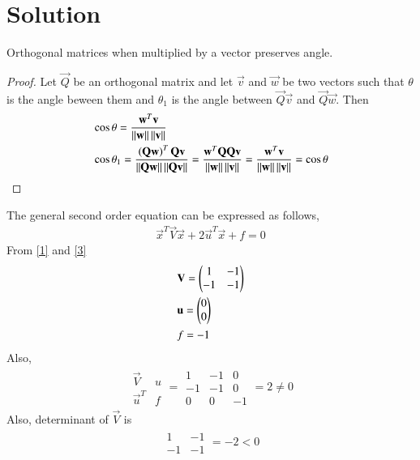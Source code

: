 \documentclass[journal,12pt,twocolumn]{IEEEtran}
\begin{document}
\section{Solution}
\begin{lemma} \label{0}
	Orthogonal matrices when multiplied by a vector preserves angle.
\end{lemma}
\begin{proof}
Let $\vec{Q}$ be an orthogonal matrix and let $\vec{v}$ and $\vec{w}$ be two vectors such that $\theta$ is the angle beween them and $\theta_1$ is the angle between $\vec{Q}\vec{v}$ and $\vec{Q}\vec{w}$. Then
\begin{align}
&	\cos\theta = \frac{\mathbf{w}^T\mathbf{v}}{\left\lVert\mathbf{w}\right\rVert\left\lVert\mathbf{v}\right\rVert} \\
&   \cos\theta_1 = \frac{\left(\mathbf{Q}\mathbf{w}\right)^T\mathbf{Q}\mathbf{v}}{\left\lVert\mathbf{Q}\mathbf{w}\right\rVert\left\lVert\mathbf{Q}\mathbf{v}\right\rVert} = \frac{\mathbf{w}^T\mathbf{Q}\mathbf{Q}\mathbf{v}}{\left\lVert\mathbf{w}\right\rVert\left\lVert\mathbf{v}\right\rVert} = \frac{\mathbf{w}^T\mathbf{v}}{\left\lVert\mathbf{w}\right\rVert\left\lVert\mathbf{v}\right\rVert} = \cos\theta
\end{align} 
\end{proof}
The general second order equation can be expressed as follows,
\begin{align}
	\vec{x}^T\vec{V}\vec{x} + 2\vec{u}^T\vec{x} + f = 0 \label{3}
\end{align}
From \eqref{1} and \eqref{3}
\begin{align}
	& \mathbf{V} = \begin{pmatrix}1 & -1 \\ -1 & -1\end{pmatrix} \\ 
	& \mathbf{u} = \begin{pmatrix}0 \\0\end{pmatrix}\\
	& f = -1
\end{align}
Also,
\begin{align}
	\begin{array}{|cc|}
		\vec{V} & u\\ \vec{u}^T & f
	\end{array} = \begin{array}{|ccc|}
	1 & -1 & 0 \\ -1  & -1 &  0 \\ 0 & 0&-1
\end{array}  = 2 \not=0
    \end{align}
Also, determinant of $\vec{V}$ is
\begin{align}
 \begin{array}{|cc|}
 	1 & -1\\ -1 & -1
 \end{array} = -2 < 0
\end{align}
\end{document}
